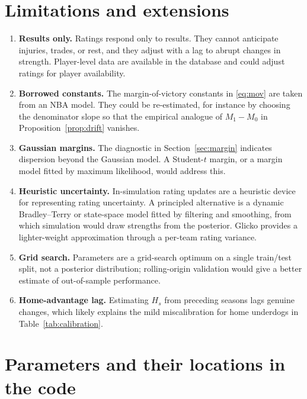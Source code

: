 \documentclass[11pt]{article}
\theoremstyle{plain}
\theoremstyle{definition}
\theoremstyle{remark}
\begin{document}
\section{Limitations and extensions}\label{sec:limits}

\begin{enumerate}
  \item \textbf{Results only.} Ratings respond only to results. They cannot anticipate injuries, trades, or rest, and they adjust with a lag to abrupt changes in strength. Player-level data are available in the database and could adjust ratings for player availability.
  \item \textbf{Borrowed constants.} The margin-of-victory constants in \eqref{eq:mov} are taken from an NBA model. They could be re-estimated, for instance by choosing the denominator slope so that the empirical analogue of $M_1 - M_0$ in Proposition~\ref{prop:drift} vanishes.
  \item \textbf{Gaussian margins.} The diagnostic in Section~\ref{sec:margin} indicates dispersion beyond the Gaussian model. A Student-$t$ margin, or a margin model fitted by maximum likelihood, would address this.
  \item \textbf{Heuristic uncertainty.} In-simulation rating updates are a heuristic device for representing rating uncertainty. A principled alternative is a dynamic Bradley--Terry or state-space model fitted by filtering and smoothing, from which simulation would draw strengths from the posterior. Glicko \cite{glickman1999} provides a lighter-weight approximation through a per-team rating variance.
  \item \textbf{Grid search.} Parameters are a grid-search optimum on a single train/test split, not a posterior distribution; rolling-origin validation would give a better estimate of out-of-sample performance.
  \item \textbf{Home-advantage lag.} Estimating $H_s$ from preceding seasons lags genuine changes, which likely explains the mild miscalibration for home underdogs in Table~\ref{tab:calibration}.
\end{enumerate}

\appendix

\section{Parameters and their locations in the code}\label{app:params}
\end{document}
